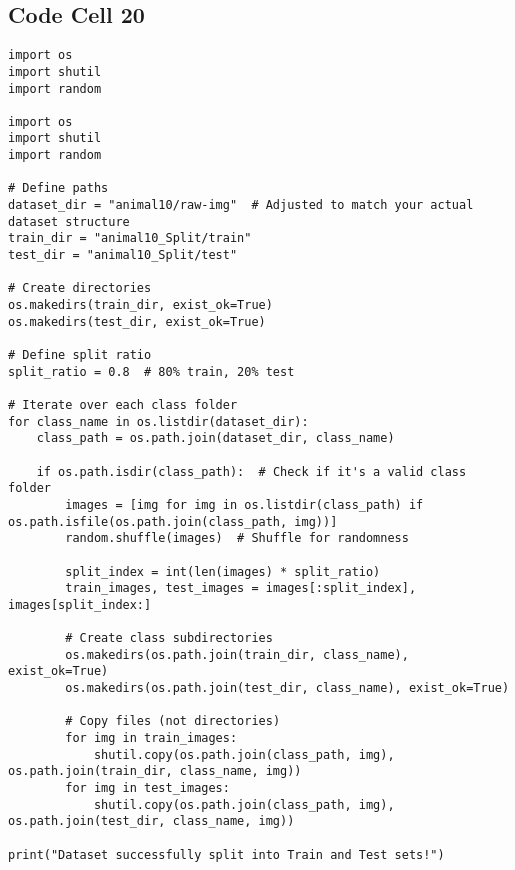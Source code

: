 \documentclass{article}
\begin{document}
\subsection*{Code Cell 20}
\begin{lstlisting}
import os
import shutil
import random

import os
import shutil
import random

# Define paths
dataset_dir = "animal10/raw-img"  # Adjusted to match your actual dataset structure
train_dir = "animal10_Split/train"
test_dir = "animal10_Split/test"

# Create directories
os.makedirs(train_dir, exist_ok=True)
os.makedirs(test_dir, exist_ok=True)

# Define split ratio
split_ratio = 0.8  # 80% train, 20% test

# Iterate over each class folder
for class_name in os.listdir(dataset_dir):
    class_path = os.path.join(dataset_dir, class_name)

    if os.path.isdir(class_path):  # Check if it's a valid class folder
        images = [img for img in os.listdir(class_path) if os.path.isfile(os.path.join(class_path, img))]
        random.shuffle(images)  # Shuffle for randomness

        split_index = int(len(images) * split_ratio)
        train_images, test_images = images[:split_index], images[split_index:]

        # Create class subdirectories
        os.makedirs(os.path.join(train_dir, class_name), exist_ok=True)
        os.makedirs(os.path.join(test_dir, class_name), exist_ok=True)

        # Copy files (not directories)
        for img in train_images:
            shutil.copy(os.path.join(class_path, img), os.path.join(train_dir, class_name, img))
        for img in test_images:
            shutil.copy(os.path.join(class_path, img), os.path.join(test_dir, class_name, img))

print("Dataset successfully split into Train and Test sets!")

\end{lstlisting}
\end{document}
